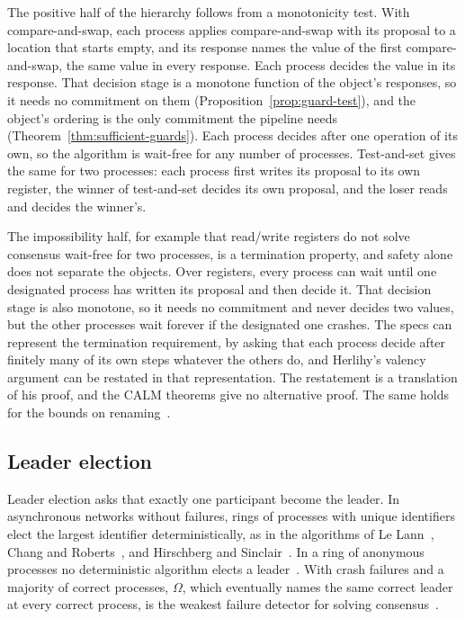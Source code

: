 \documentclass[sigconf]{cidr-2027}
\theoremstyle{remark}
\newcommand{\commitment}{commitment\xspace}
\begin{document}
The positive half of the hierarchy follows from a monotonicity test. With
compare-and-swap, each process applies compare-and-swap with its proposal to
a location that starts empty, and its response names the value of the first
compare-and-swap, the same value in every response. Each process decides the
value in its response. That decision stage is a monotone function of the
object's responses, so it needs no \commitment on them (Proposition~\ref{prop:guard-test}), and the object's ordering is the only \commitment the pipeline needs (Theorem~\ref{thm:sufficient-guards}). Each process decides after one operation of its own, so the
algorithm is wait-free for any number of processes. Test-and-set gives the
same for two processes: each process first writes its proposal to its own
register, the winner of test-and-set decides its own proposal, and the loser
reads and decides the winner's.

The impossibility half, for example that read/write registers do not solve
consensus wait-free for two processes, is a termination property, and safety
alone does not separate the objects. Over registers, every process can wait
until one designated process has written its proposal and then decide it. That decision stage is also monotone, so it needs no \commitment and never
decides two values, but the other processes wait forever if the designated
one crashes. The specs can represent the termination requirement, by asking
that each process decide after finitely many of its own steps whatever the
others do, and Herlihy's valency argument can be restated in that
representation. The restatement is a translation of his proof, and the CALM
theorems give no alternative proof. The same holds for the bounds on
renaming~\cite{attiya1990renaming,herlihy1999topological}.

\subsection{Leader election}
\label{app:leader}

Leader election asks that exactly one participant become the leader. In
asynchronous networks without failures, rings of processes with unique
identifiers elect the largest identifier deterministically, as in the
algorithms of Le Lann~\cite{lelann1977distributed}, Chang and
Roberts~\cite{chang1979improved}, and Hirschberg and
Sinclair~\cite{hirschberg1980decentralized}. In a ring of anonymous
processes no deterministic algorithm elects a leader~\cite{angluin1980local}. With crash failures and a majority of correct processes, $\Omega$, which
eventually names the same correct leader at every correct process, is the
weakest failure detector for solving consensus~\cite{chandra1996weakest}.
\end{document}
